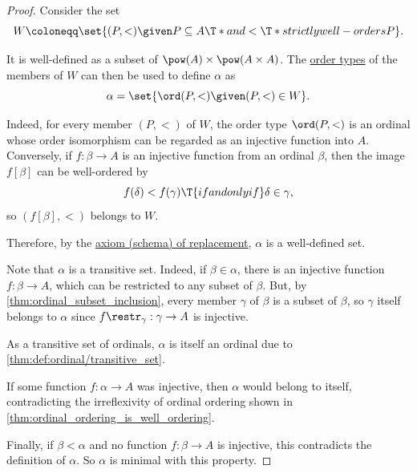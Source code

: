 \begin{proof}
   Consider the set
  \begin{equation*}
    W \coloneqq \set{ (P, <) \given P \subseteq A \T*{and} < \T*{strictly well-orders} P }.
  \end{equation*}

  It is well-defined as a subset of \( \pow(A) \times \pow(A \times A) \). The \hyperref[def:well_ordered_order_type]{order types} of the members of \( W \) can then be used to define \( \alpha \) as
  \begin{equation*}
    \alpha = \set{ \ord(P, <) \given (P, <) \in W }.
  \end{equation*}

  Indeed, for every member \( (P, <) \) of \( W \), the order type \( \ord(P, <) \) is an ordinal whose order isomorphism can be regarded as an injective function into \( A \). Conversely, if \( f: \beta \to A \) is an injective function from an ordinal \( \beta \), then the image \( f[\beta] \) can be well-ordered by
  \begin{equation*}
    f(\delta) < f(\gamma) \T{if and only if} \delta \in \gamma,
  \end{equation*}
  so \( (f[\beta], <) \) belongs to \( W \).

  Therefore, by the \hyperref[def:zfc/replacement]{axiom (schema) of replacement}, \( \alpha \) is a well-defined set.

   Note that \( \alpha \) is a transitive set. Indeed, if \( \beta \in \alpha \), there is an injective function \( f: \beta \to A \), which can be restricted to any subset of \( \beta \). But, by \cref{thm:ordinal_subset_inclusion}, every member \( \gamma \) of \( \beta \) is a subset of \( \beta \), so \( \gamma \) itself belongs to \( \alpha \) since \( f\restr_\gamma: \gamma \to A \) is injective.

  As a transitive set of ordinals, \( \alpha \) is itself an ordinal due to \cref{thm:def:ordinal/transitive_set}.

   If some function \( f: \alpha \to A \) was injective, then \( \alpha \) would belong to itself, contradicting the irreflexivity of ordinal ordering shown in \cref{thm:ordinal_ordering_is_well_ordering}.

   Finally, if \( \beta < \alpha \) and no function \( f: \beta \to A \) is injective, this contradicts the definition of \( \alpha \). So \( \alpha \) is minimal with this property.
\end{proof}

